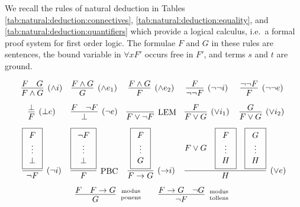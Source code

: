 
\begin{definition}\label{def:natural:deduction}
	We recall the rules of {\myem natural deduction}  in Tables 
	\ref{tab:natural:deduction:connectives}, \ref{tab:natural:deduction:equality}, 
	and \ref{tab:natural:deduction:quantifiers} which provide a logical calculus, 
	i.e.~a formal proof system for first order logic. 
	The formulae $F$ and $G$ in these rules are sentences, 
	the bound variable in  $\forall x F'$ occurs free in $F'$, 
	and terms $s$ and $t$ are ground.

\begin{table}[hbt]
\begin{gather*}
\begin{array}{ccccc}
\infer[(\land i)]{F\land G}{F & G} 
&
\infer[(\land e_1)]{G}{F \land G} 
&
\infer[(\land e_2)]{F}{F \land G}
&
\infer[(\lnot\lnot i)]{\lnot\lnot F}{F} 
&
\infer[(\lnot\lnot e)]{F}{\lnot\lnot F}
\\[0.7em]
\infer[(\bot e)]{F}{\bot}
&
\infer[(\lnot e)]{\bot}{F & \lnot F}
&
\infer[\text{LEM}]{F\lor\lnot F}{}
&
\infer[(\lor i_1)]{F\lor G}{F}
&
\infer[(\lor i_2)]{F\lor G}{G}
\\[0.7em]
\infer[(\lnot i)]{\lnot F}{
	\boxed{\begin{array}{c}F\\\vdots\\\bot\end{array}}}
&
\infer[\text{PBC}]{F}{
	\boxed{\begin{array}{c}\lnot F\\\vdots\\\bot\end{array}}}
&
\infer[({\limp} i)]{F\limp G}{
	\boxed{\begin{array}{c}F\\\vdots\\G\end{array}
}}
&
\multicolumn{2}{l}{
	\infer[(\lor e)]{H}{
		F\lor G &
		\boxed{\begin{array}{c}F\\\vdots\\H\end{array}} &
		\boxed{\begin{array}{c}G\\\vdots\\H\end{array}}
	}	
}
\\[0.7em]
&
\multicolumn{3}{r}{
\infer[\text{modus}\atop\text{ponens}]{G}{F & F\limp G}
\qquad
\infer[\text{modus}\atop\text{tollens}]{\lnot F}{F\limp G & \lnot G}
}
&
\end{array}
\end{gather*}
\caption{Natural Deduction Rules for Connectives}
\label{tab:natural:deduction:connectives}
\end{table}


\end{definition}

